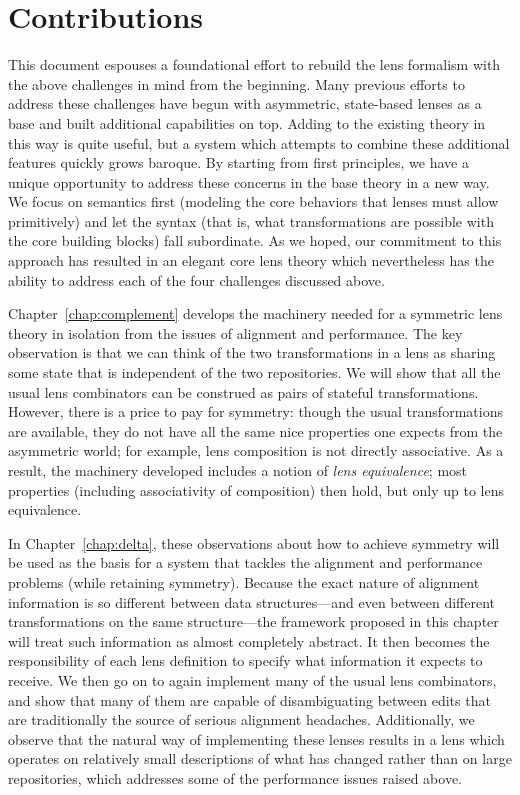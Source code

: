 \section{Contributions}
\label{sec:intro-contributions}
This document espouses a foundational effort to rebuild the lens formalism
with the above challenges in mind from the beginning. Many previous efforts
to address these challenges have begun with asymmetric, state-based lenses
as a base and built additional capabilities on top. Adding to the existing
theory in this way is quite useful, but a system which attempts to combine
these additional features quickly grows baroque. By starting from first
principles, we have a unique opportunity to address these concerns in the
base theory in a new way. We focus on semantics first (modeling the core
behaviors that lenses must allow primitively) and let the syntax (that is,
what transformations are possible with the core building blocks) fall
subordinate. As we hoped, our commitment to this approach has resulted in an
elegant core lens theory which nevertheless has the ability to address each
of the four challenges discussed above.

Chapter~\ref{chap:complement} develops the machinery needed for a symmetric
lens theory in isolation from the issues of alignment and performance. The
key observation is that we can think of the two transformations in a lens as
sharing some state that is independent of the two repositories. We will show
that all the usual lens combinators can be construed as pairs of stateful
transformations. However, there is a price to pay for symmetry: though the
usual transformations are available, they do not have all the same nice
properties one expects from the asymmetric world; for example, lens
composition is not directly associative. As a result, the machinery
developed includes a notion of \emph{lens equivalence}; most properties
(including associativity of composition) then hold, but only up to lens
equivalence.

In Chapter~\ref{chap:delta}, these observations about how to achieve
symmetry will be used as the basis for a system that tackles the alignment
and performance problems (while retaining symmetry). Because the exact
nature of alignment information is so different between data
structures---and even between different transformations on the same
structure---the framework proposed in this chapter will treat such
information as almost completely abstract. It then becomes the
responsibility of each lens definition to specify what information it
expects to receive. We then go on to again implement many of the usual lens
combinators, and show that many of them are capable of disambiguating
between edits that are traditionally the source of serious alignment
headaches. Additionally, we observe that the natural way of implementing
these lenses results in a lens which operates on relatively small
descriptions of what has changed rather than on large repositories, which
addresses some of the performance issues raised above.


